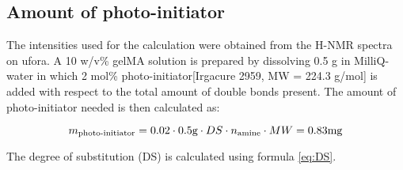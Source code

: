 \subsection{Amount of photo-initiator}

The intensities used for the calculation were obtained from the H-NMR spectra on ufora. A 10 w/v\% gelMA solution is prepared by dissolving 0.5 g in MilliQ-water in which
2 mol\% photo-initiator[Irgacure 2959, MW = 224.3 g/mol] is added with respect to the total amount of double bonds present. The amount of photo-initiator needed is then calculated as:

\begin{equation}
    m_{\text{photo-initiator}} = 0.02 \cdot 0.5 \g \cdot DS \cdot n_{\text{amine}} \cdot MW = 0.83 \unit{mg}
\end{equation}

The degree of substitution (DS) is calculated using formula \ref{eq:DS}.